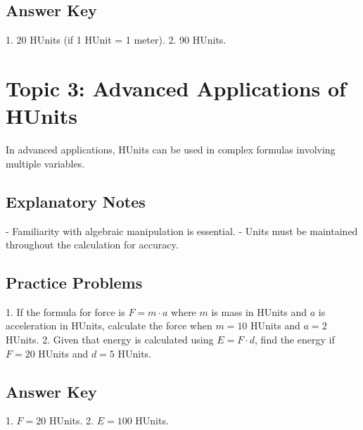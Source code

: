 \documentclass{article}
\begin{document}
\subsection*{Answer Key}
1. 20 HUnits (if 1 HUnit = 1 meter).
2. 90 HUnits.

\section*{Topic 3: Advanced Applications of HUnits}
In advanced applications, HUnits can be used in complex formulas involving multiple variables.

\subsection*{Explanatory Notes}
- Familiarity with algebraic manipulation is essential.
- Units must be maintained throughout the calculation for accuracy.

\subsection*{Practice Problems}
1. If the formula for force is \( F = m \cdot a \) where \( m \) is mass in HUnits and \( a \) is acceleration in HUnits, calculate the force when \( m = 10 \) HUnits and \( a = 2 \) HUnits.
2. Given that energy is calculated using \( E = F \cdot d \), find the energy if \( F = 20 \) HUnits and \( d = 5 \) HUnits.

\subsection*{Answer Key}
1. \( F = 20 \) HUnits.
2. \( E = 100 \) HUnits.
\end{document}

